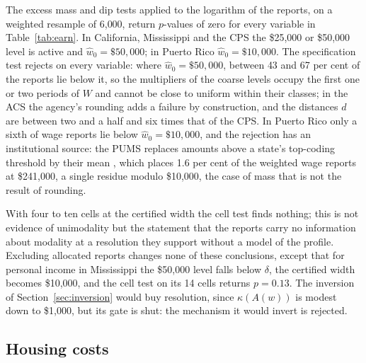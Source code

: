 The excess mass and dip tests applied to the logarithm of the reports, on a weighted resample of 6{,}000, return $p$-values of zero for every variable in Table~\ref{tab:earn}. In California, Mississippi and the CPS the \$25{,}000 or \$50{,}000 level is active and $\hat w_0=\$50{,}000$; in Puerto Rico $\hat w_0=\$10{,}000$. The specification test rejects on every variable: where $\hat w_0=\$50{,}000$, between 43 and 67 per cent of the reports lie below it, so the multipliers of the coarse levels occupy the first one or two periods of $W$ and cannot be close to uniform within their classes; in the ACS the agency's rounding adds a failure by construction, and the distances $d$ are between two and a half and six times that of the CPS. In Puerto Rico only a sixth of wage reports lie below $\hat w_0=\$10{,}000$, and the rejection has an institutional source: the PUMS replaces amounts above a state's top-coding threshold by their mean \citep{ACSPUMS2023}, which places 1.6 per cent of the weighted wage reports at \$241{,}000, a single residue modulo \$10{,}000, the case of mass that is not the result of rounding.

With four to ten cells at the certified width the cell test finds nothing; this is not evidence of unimodality but the statement that the reports carry no information about modality at a resolution they support without a model of the profile. Excluding allocated reports changes none of these conclusions, except that for personal income in Mississippi the \$50{,}000 level falls below $\delta$, the certified width becomes \$10{,}000, and the cell test on its 14 cells returns $p=0.13$. The inversion of Section~\ref{sec:inversion} would buy resolution, since $\kappa(A(w))$ is modest down to \$1{,}000, but its gate is shut: the mechanism it would invert is rejected.

\subsection{Housing costs}

\begin{table}[t]
\centering\small
\caption{Monthly housing costs, ACS 2022, California. Columns as in Table~\ref{tab:earn}; ``valley'' is the interval, in dollars a month, that must contain a local minimum of the latent density, and $p^\ast$ the identified set \eqref{eq:pstar} for its percentile. All specification $p$-values are $0.002$.}\label{tab:housing}
\end{table}

